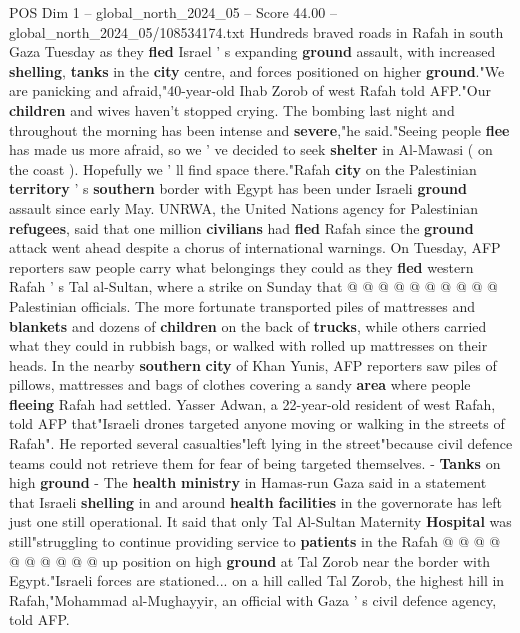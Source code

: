 \begin{textsample}{POS Dim 1 – global\_north\_2024\_05 – Score 44.00 – global\_north\_2024\_05/108534174.txt}  \label{ex:f1_pos_276}
Hundreds braved roads in Rafah in south Gaza Tuesday as they \textbf{fled} Israel ' s expanding \textbf{ground} assault, with increased \textbf{shelling}, \textbf{tanks} in the \textbf{city} centre, and forces positioned on higher \textbf{ground}."We are panicking and afraid,"40-year-old Ihab Zorob of west Rafah told AFP."Our \textbf{children} and wives haven't stopped crying.
The bombing last night and throughout the morning has been intense and \textbf{severe},"he said."Seeing people \textbf{flee} has made us more afraid, so we ' ve decided to seek \textbf{shelter} in Al-Mawasi ( on the coast ).
Hopefully we ' ll find space there."Rafah \textbf{city} on the Palestinian \textbf{territory} ' s \textbf{southern} border with Egypt has been under Israeli \textbf{ground} assault since early May.
UNRWA, the United Nations agency for Palestinian \textbf{refugees}, said that one million \textbf{civilians} had \textbf{fled} Rafah since the \textbf{ground} attack went ahead despite a chorus of international warnings.
On Tuesday, AFP reporters saw people carry what belongings they could as they \textbf{fled} western Rafah ' s Tal al-Sultan, where a strike on Sunday that @ @ @ @ @ @ @ @ @ @ Palestinian officials.
The more fortunate transported piles of mattresses and \textbf{blankets} and dozens of \textbf{children} on the back of \textbf{trucks}, while others carried what they could in rubbish bags, or walked with rolled up mattresses on their heads.
In the nearby \textbf{southern} \textbf{city} of Khan Yunis, AFP reporters saw piles of pillows, mattresses and bags of clothes covering a sandy \textbf{area} where people \textbf{fleeing} Rafah had settled.
Yasser Adwan, a 22-year-old resident of west Rafah, told AFP that"Israeli drones targeted anyone moving or walking in the streets of Rafah".
He reported several casualties"left lying in the street"because civil defence teams could not retrieve them for fear of being targeted themselves. - \textbf{Tanks} on high \textbf{ground} - The \textbf{health} \textbf{ministry} in Hamas-run Gaza said in a statement that Israeli \textbf{shelling} in and around \textbf{health} \textbf{facilities} in the governorate has left just one still operational.
It said that only Tal Al-Sultan Maternity \textbf{Hospital} was still"struggling to continue providing service to \textbf{patients} in the Rafah @ @ @ @ @ @ @ @ @ @ up position on high \textbf{ground} at Tal Zorob near the border with Egypt."Israeli forces are stationed... on a hill called Tal Zorob, the highest hill in Rafah,"Mohammad al-Mughayyir, an official with Gaza ' s civil defence agency, told AFP.

\end{textsample}
